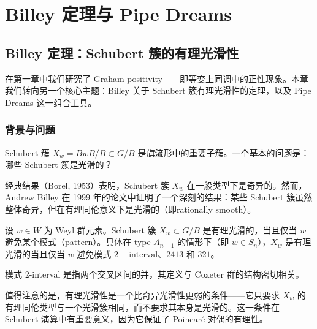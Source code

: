 
\chapter{Billey 定理与 Pipe Dreams}
\label{chap:BilleyPipeDreams}

\section{Billey 定理：Schubert 簇的有理光滑性}

在第一章中我们研究了 Graham  positivity——即等变上同调中的正性现象。本章我们转向另一个核心主题：Billey 关于 Schubert 簇有理光滑性的定理，以及 Pipe Dreams 这一组合工具。

\subsection{背景与问题}

Schubert 簇 $X_w = \overline{B w B / B} \subset G/B$ 是旗流形中的重要子簇。一个基本的问题是：哪些 Schubert 簇是光滑的？

经典结果（Borel, 1953）表明，Schubert 簇 $X_w$ 在一般类型下是奇异的。然而，Andrew Billey 在 1999 年的论文中证明了一个深刻的结果：某些 Schubert 簇虽然整体奇异，但在有理同伦意义下是光滑的（即rationally smooth）。

\begin{Theorem}
\label{th:BilleyRationalSmooth}
设 $w \in W$ 为 Weyl 群元素。Schubert 簇 $X_w \subset G/B$ 是有理光滑的，当且仅当 $w$ 避免某个模式（pattern）。具体在 type $A_{n-1}$ 的情形下（即 $w \in S_n$），$X_w$ 是有理光滑的当且仅当 $w$ 避免模式 $2\!-\!\text{interval}$、$2413$ 和 $321$。
\end{Theorem}

模式 $2$-interval 是指两个交叉区间的并，其定义与 Coxeter 群的结构密切相关。

\begin{Remark}
值得注意的是，有理光滑性是一个比奇异光滑性更弱的条件——它只要求 $X_w$ 的有理同伦类型与一个光滑簇相同，而不要求其本身是光滑的。这一条件在 Schubert 演算中有重要意义，因为它保证了 Poincaré 对偶的有理性。
\end{Remark}


